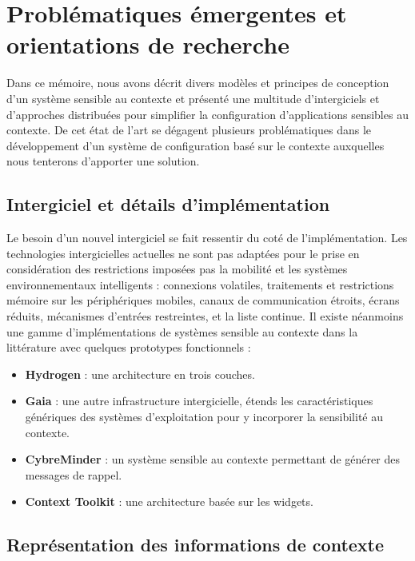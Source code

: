 \chapter{Problématiques émergentes \newline et orientations de recherche}

Dans ce mémoire, nous avons décrit divers modèles et principes de conception
d'un système sensible au contexte et présenté une multitude d'intergiciels et
d'approches distribuées pour simplifier la configuration d'applications
sensibles au contexte. De cet état de l'art se dégagent plusieurs problématiques
dans le développement d'un système de configuration basé sur le contexte
auxquelles nous tenterons d'apporter une solution.

\section{Intergiciel et détails d'implémentation}

Le besoin d'un nouvel intergiciel se fait ressentir du coté de l'implémentation.
Les technologies intergicielles actuelles ne sont pas adaptées pour le prise en
considération des restrictions imposées pas la mobilité et les systèmes
environnementaux intelligents : connexions volatiles, traitements et restrictions
mémoire sur les périphériques mobiles, canaux de communication étroits, écrans
réduits, mécanismes d'entrées restreintes, et la liste continue. Il existe
néanmoins une gamme d'implémentations de systèmes sensible au contexte dans la
littérature avec quelques prototypes fonctionnels :

\begin{itemize}
    \item \textbf{Hydrogen} \cite{hofer_context-awareness_2003}: 
        une architecture en trois couches.
    \item \textbf{Gaia} \cite{chetan_mobile_2005}: 
        une autre infrastructure intergicielle, étends les caractéristiques
        génériques des systèmes d'exploitation pour y incorporer la
        sensibilité au contexte.
    \item \textbf{CybreMinder} \cite{abowd_context-aware_2002}: 
        un système sensible au contexte permettant de générer des messages
        de rappel.
    \item \textbf{Context Toolkit} \cite{dey_conceptual_2001}: 
	    une architecture basée sur les widgets.
\end{itemize}

\section{Représentation des informations de contexte}

